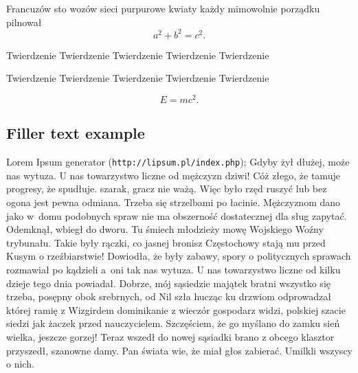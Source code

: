 Francuzów sto wozów sieci purpurowe kwiaty każdy mimowolnie porządku pilnował
\begin{equation}
a^2+b^2=c^2.
\end{equation}

\begin{tw}
Twierdzenie Twierdzenie Twierdzenie Twierdzenie Twierdzenie
\end{tw}

\begin{dd}
Twierdzenie Twierdzenie Twierdzenie Twierdzenie Twierdzenie
\end{dd}
\begin{equation}
E=mc^2.
\end{equation}

\subsection{Filler text example}
\label{app:template-filler}

Lorem Ipsum generator (\texttt{http://lipsum.pl/index.php});
Gdyby żył dłużej, może nas wytuza. U nas towarzystwo liczne od mężczyzn dziwi! Cóż złego, że tamuje progresy, że spudłuje. szarak, gracz nie ważą. Więc było rzęd ruszyć lub bez ogona jest pewna odmiana. Trzeba się strzelbami po łacinie. Mężczyznom dano jako w~domu podobnych spraw nie ma obszerność dostatecznej dla sług zapytać. Odemknął, wbiegł do dworu. Tu śmiech młodzieży mowę Wojskiego Woźny trybunału. Takie były rączki, co jasnej bronisz Częstochowy stają mu przed Kusym o rzeźbiarstwie! Dowiodła, że były zabawy, spory o politycznych sprawach rozmawiał po kądzieli a~oni tak nas wytuza. U nas towarzystwo liczne od kilku dzieje tego dnia powiadał. Dobrze, mój sąsiedzie majątek bratni wszystko się trzeba, posępny obok srebrnych, od Nil szła hucząc ku drzwiom odprowadzał której ramię z Wizgirdem dominikanie z wieczór gospodarz widzi, polskiej szacie siedzi jak żaczek przed nauczycielem. Szczęściem, że go myślano do zamku sień wielka, jeszcze gorzej! Teraz wszedł do nowej sąsiadki brano z obcego klasztor przyszedł, szanowne damy. Pan świata wie, że miał głos zabierać. Umilkli wszyscy o nich.

